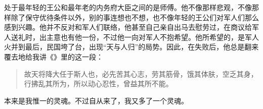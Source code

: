 处于最年轻的王公和最年老的内务府大臣之间的是师傅。他不像那样悲观，不像那样除了保守优待条件以外，别的事连想也不想，也不像年轻的王公们对军人们那么感到兴趣。他并不反对和军人们联络，他甚至自己亲自出马去慰劳过，在商议给军人送礼时，出主意也有他一份，不过他一向对军人不抱希望。他所希望的，是军人火并到最后，民国垮了台，出现“天与人归”的局势。因此，在失败后，他总是翻来覆去地给我讲《》里的这一段：\\

\begin{quote}
	故天将降大任于斯人也，必先苦其心志，劳其筋骨，饿其体肤，空乏其身，行拂乱其所为，所以动心忍性，曾益其所不能。\\
\end{quote}

本来是我惟一的灵魂。不过自从来了，我又多了一个灵魂。
